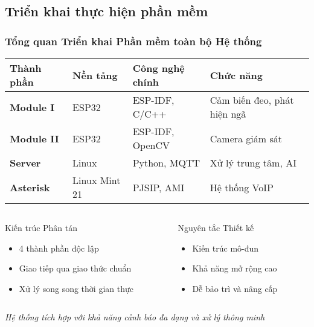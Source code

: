 \subsection{Triển khai thực hiện phần mềm}
\begin{frame}
\frametitle{Tổng quan Triển khai Phần mềm toàn bộ Hệ thống}

\begin{table}[htbp]
\centering
\small
\begin{tabular}{|l|l|l|l|}
\hline
\textbf{Thành phần} & \textbf{Nền tảng} & \textbf{Công nghệ chính} & \textbf{Chức năng} \\
\hline
\textbf{Module I} & ESP32 & ESP-IDF, C/C++ & Cảm biến đeo, phát hiện ngã \\
\hline
\textbf{Module II} & ESP32 & ESP-IDF, OpenCV & Camera giám sát \\
\hline
\textbf{Server} & Linux & Python, MQTT & Xử lý trung tâm, AI \\
\hline
\textbf{Asterisk} & Linux Mint 21 & PJSIP, AMI & Hệ thống VoIP \\
\hline
\end{tabular}
\end{table}

\vspace{0.3cm}

\begin{columns}[t]
\begin{column}{0.48\textwidth}
\begin{block}{Kiến trúc Phân tán}
\begin{itemize}
\item 4 thành phần độc lập
\item Giao tiếp qua giao thức chuẩn
\item Xử lý song song thời gian thực
\end{itemize}
\end{block}
\end{column}

\begin{column}{0.48\textwidth}
\begin{alertblock}{Nguyên tắc Thiết kế}
\begin{itemize}
\item Kiến trúc mô-đun
\item Khả năng mở rộng cao
\item Dễ bảo trì và nâng cấp
\end{itemize}
\end{alertblock}
\end{column}
\end{columns}

\vspace{0.3cm}
\begin{center}
\textit{\small Hệ thống tích hợp với khả năng cảnh báo đa dạng và xử lý thông minh}
\end{center}

\end{frame}
